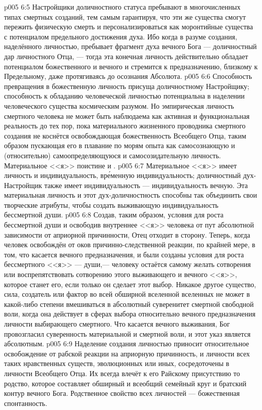 \vs p005 6:5 \pc Настройщики доличностного статуса пребывают в многочисленных типах смертных созданий, тем самым гарантируя, что эти же существа смогут пережить физическую смерть и персонализироваться как моронтийные существа с потенциалом предельного достижения духа. Ибо когда в разуме создания, наделённого личностью, пребывает фрагмент духа вечного Бога --- доличностный дар личностного Отца, --- тогда эта конечная личность действительно обладает потенциалом божественного и вечного и стремится к предназначению, близкому к Предельному, даже протягиваясь до осознания Абсолюта.
\vs p005 6:6 Способность превращения в божественную личность присуща доличностному Настройщику; способность к обладанию человеческой личностью потенциальна в наделении человеческого существа космическим разумом. Но эмпирическая личность смертного человека не может быть наблюдаема как активная и функциональная реальность до тех пор, пока материального жизненного проводника смертного создания не коснётся освобождающая божественность Всеобщего Отца, таким образом пускающая его в плавание по морям опыта как самосознающую и (относительно) самоопределяющуюся и самосозидательную личность. Материальное <<я>> поистине и .
\vs p005 6:7 \pc Материальное <<я>> имеет личность и индивидуальность, вр\'еменную индивидуальность; доличностный дух\hyp{}Настройщик также имеет индивидуальность --- индивидуальность вечную. Эта материальная личность и этот дух\hyp{}доличностность способны так объединить свои творческие атрибуты, чтобы создать выживающую индивидуальность бессмертной души.
\vs p005 6:8 Создав, таким образом, условия для роста бессмертной души и освободив внутреннее <<я>> человека от пут абсолютной зависимости от априорной причинности, Отец отходит в сторону. Теперь, когда человек освобождён от оков причинно\hyp{}следственной реакции, по крайней мере, в том, что касается вечного предназначения, и были созданы условия для роста бессмертного <<я>> --- души,--- человеку остаётся самому желать сотворения или воспрепятствовать сотворению этого выживающего и вечного <<я>>, которое станет его, если только он сделает этот выбор. Никакое другое существо, сила, создатель или фактор во всей обширной вселенной вселенных не может в какой\hyp{}либо степени вмешиваться в абсолютный суверенитет смертной свободной воли, когда она действует в сферах выбора относительно вечного предназначения личности выбирающего смертного. Что касается вечного выживания, Бог провозгласил суверенность материальной и смертной воли, и этот указ является абсолютным.
\vs p005 6:9 \pc Наделение создания личностью приносит относительное освобождение от рабской реакции на априорную причинность, и личности всех таких нравственных существ, эволюционных или иных, сосредоточены в личности Всеобщего Отца. Их всегда влечёт к его Райскому присутствию то родство, которое составляет обширный и всеобщий семейный круг и братский контур вечного Бога. Родственное свойство всех личностей --- божественная спонтанность.
